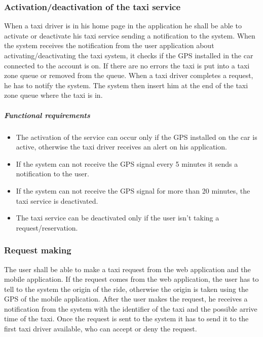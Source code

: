 \subsubsection{Activation/deactivation of the taxi service}
When a taxi driver is in his home page in the application he shall be able to activate or deactivate his taxi service sending a notification to the system.
When the system receives the notification from the user application about activating/deactivating the taxi system, it checks if the GPS installed in the car connected to the account is on. If there are no errors the taxi is put into a taxi zone queue or removed from the queue.
When a taxi driver completes a request, he has to notify the system. The system then insert him at the end of the taxi zone queue where the taxi is in.

	\subparagraph{Functional requirements}
	\noindent
		\begin{itemize}
			\item The activation of the service can occur only if the GPS installed on the car is active, otherwise the taxi driver receives an alert on his application.
			\item If the system can not receive the GPS signal every 5 minutes it sends a notification to the user.
			\item If the system can not receive the GPS signal for more than 20 minutes, the taxi service is deactivated.
			\item The taxi service can be deactivated only if the user isn't taking a request/reservation.
		\end{itemize} 


\subsubsection{Request making}
The user shall be able to make a taxi request from the web application and the mobile application. If the request comes from the web application, the user has to tell to the system the origin of the ride, otherwise the origin is taken using the GPS of the mobile application.
After the user makes the request, he receives a notification from the system with the identifier of the taxi and the possible arrive time of the taxi.
Once the request is sent to the system it has to send it to the first taxi driver available, who can accept or deny the request.

